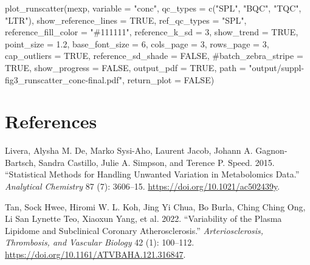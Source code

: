 \documentclass[
  letterpaper,
  DIV=11,
  numbers=noendperiod]{scrartcl}
\newenvironment{Shaded}{\begin{snugshade}}{\end{snugshade}}
\newcommand{\AttributeTok}[1]{\textcolor[rgb]{0.40,0.45,0.13}{#1}}
\newcommand{\CommentTok}[1]{\textcolor[rgb]{0.37,0.37,0.37}{#1}}
\newcommand{\ConstantTok}[1]{\textcolor[rgb]{0.56,0.35,0.01}{#1}}
\newcommand{\DecValTok}[1]{\textcolor[rgb]{0.68,0.00,0.00}{#1}}
\newcommand{\FloatTok}[1]{\textcolor[rgb]{0.68,0.00,0.00}{#1}}
\newcommand{\FunctionTok}[1]{\textcolor[rgb]{0.28,0.35,0.67}{#1}}
\newcommand{\NormalTok}[1]{\textcolor[rgb]{0.00,0.23,0.31}{#1}}
\newcommand{\StringTok}[1]{\textcolor[rgb]{0.13,0.47,0.30}{#1}}
\newlength{\cslhangindent}
\newenvironment{CSLReferences}[2] %
 {\begin{list}{}{%
  \setlength{\itemindent}{0pt}
  \setlength{\leftmargin}{0pt}
  \setlength{\parsep}{0pt}
  \ifodd #1
   \setlength{\leftmargin}{\cslhangindent}
   \setlength{\itemindent}{-1\cslhangindent}
  \fi
  \setlength{\itemsep}{#2\baselineskip}}}
 {\end{list}}
\begin{document}
\begin{Shaded}
\begin{Highlighting}[]
\FunctionTok{plot\_runscatter}\NormalTok{(mexp, }
  \AttributeTok{variable =} \StringTok{"conc"}\NormalTok{, }
  \AttributeTok{qc\_types =} \FunctionTok{c}\NormalTok{(}\StringTok{"SPL"}\NormalTok{, }\StringTok{"BQC"}\NormalTok{, }\StringTok{"TQC"}\NormalTok{, }\StringTok{"LTR"}\NormalTok{), }
  \AttributeTok{show\_reference\_lines =} \ConstantTok{TRUE}\NormalTok{,}
  \AttributeTok{ref\_qc\_types =} \StringTok{"SPL"}\NormalTok{,}
  \AttributeTok{reference\_fill\_color =} \StringTok{"\#111111"}\NormalTok{,}
  \AttributeTok{reference\_k\_sd =} \DecValTok{3}\NormalTok{,}
  \AttributeTok{show\_trend =} \ConstantTok{TRUE}\NormalTok{,}
  \AttributeTok{point\_size =} \FloatTok{1.2}\NormalTok{,}
  \AttributeTok{base\_font\_size =} \DecValTok{6}\NormalTok{,}
  \AttributeTok{cols\_page =} \DecValTok{3}\NormalTok{,}
  \AttributeTok{rows\_page =} \DecValTok{3}\NormalTok{,}
  \AttributeTok{cap\_outliers =} \ConstantTok{TRUE}\NormalTok{,}
  \AttributeTok{reference\_sd\_shade =} \ConstantTok{FALSE}\NormalTok{,}
  \CommentTok{\#batch\_zebra\_stripe = TRUE, }
  \AttributeTok{show\_progress =} \ConstantTok{FALSE}\NormalTok{,}
  \AttributeTok{output\_pdf =} \ConstantTok{TRUE}\NormalTok{,}
  \AttributeTok{path =} \StringTok{"output/suppl{-}fig3\_runscatter\_conc{-}final.pdf"}\NormalTok{, }\AttributeTok{return\_plot =} \ConstantTok{FALSE}\NormalTok{)}
\end{Highlighting}
\end{Shaded}

\section*{References}\label{references}

\label{refs}
\begin{CSLReferences}{1}{0}
Livera, Alysha M. De, Marko Sysi-Aho, Laurent Jacob, Johann A.
Gagnon-Bartsch, Sandra Castillo, Julie A. Simpson, and Terence P. Speed.
2015. {``Statistical Methods for Handling Unwanted Variation in
Metabolomics Data.''} \emph{Analytical Chemistry} 87 (7): 3606--15.
\url{https://doi.org/10.1021/ac502439y}.

Tan, Sock Hwee, Hiromi W. L. Koh, Jing Yi Chua, Bo Burla, Ching Ching
Ong, Li San Lynette Teo, Xiaoxun Yang, et al. 2022. {``Variability of
the Plasma Lipidome and Subclinical Coronary Atherosclerosis.''}
\emph{Arteriosclerosis, Thrombosis, and Vascular Biology} 42 (1):
100--112. \url{https://doi.org/10.1161/ATVBAHA.121.316847}.

\end{CSLReferences}
\end{document}
